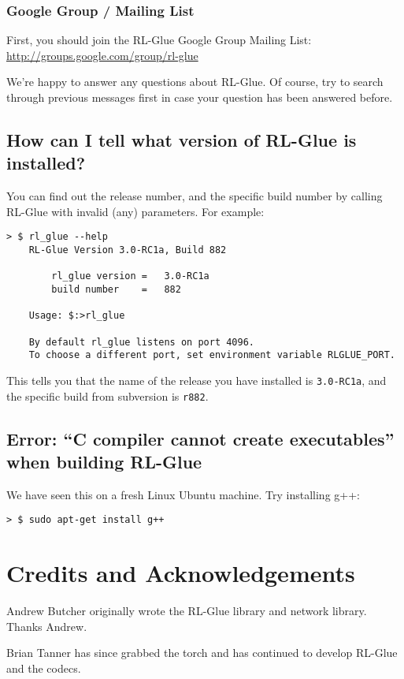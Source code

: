 \documentclass[11pt]{article}
\begin{document}
\subsubsection{Google Group / Mailing List}
First, you should join the RL-Glue Google Group Mailing List:\newline
\url{http://groups.google.com/group/rl-glue}

We're happy to answer any questions about RL-Glue.  Of course, try to search through previous messages first in case your question has been answered before.

\subsection{How can I tell what version of RL-Glue is installed?}
You can find out the release number, and the specific build number by 
calling RL-Glue with invalid (any) parameters.  For example:
\begin{verbatim}
> $ rl_glue --help
    RL-Glue Version 3.0-RC1a, Build 882

        rl_glue version	=	3.0-RC1a
        build number	=	882

    Usage: $:>rl_glue

    By default rl_glue listens on port 4096.
    To choose a different port, set environment variable RLGLUE_PORT.
\end{verbatim}

This tells you that the name of the release you have installed is \texttt{3.0-RC1a}, and the 
specific build from subversion is \texttt{r882}.


\subsection{Error: ``C compiler cannot create executables'' when building RL-Glue}

We have seen this on a fresh Linux Ubuntu machine.  Try installing g++:
\begin{verbatim}
> $ sudo apt-get install g++
\end{verbatim}


\section{Credits and Acknowledgements}
Andrew Butcher originally wrote the RL-Glue library and network library.  Thanks Andrew.

Brian Tanner has since grabbed the torch and has continued to develop RL-Glue and the codecs.
\end{document}

